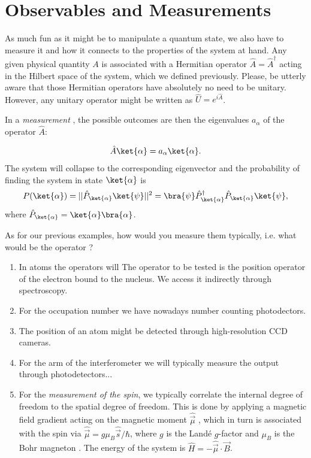 \section{Observables and Measurements}
As much fun as it might be to manipulate a quantum state, we also have to measure it and how it connects to the properties of the system at hand. Any given physical quantity $A$ is associated with a Hermitian operator $\hat{A} = \hat{A}^\dag$ acting in the Hilbert space of the system, which we defined previously. Please, be utterly aware that those Hermitian operators have absolutely no need to be unitary. However, any unitary operator might be written as $\hat{U}= e^{i\hat{A}}$.

In a \emph{measurement} , the possible outcomes are then the eigenvalues $a_\alpha$  of the operator $\hat{A}$:

\begin{align}
	\hat{A}\ket{\alpha}=a_{\alpha}\ket{\alpha}.
\end{align}
The system will collapse to the corresponding eigenvector and the probability of finding the system in state $\ket{\alpha}$ is
\begin{align}
	P(\ket{\alpha})=||\hat{P}_{\ket{\alpha}} \ket{\psi}||^2 = \bra{\psi} \hat{P}^{\dag}_{\ket{\alpha}} \hat{P}_{\ket{\alpha}} \ket{\psi},
\end{align}
where $\hat{P}_{\ket{\alpha}}= \ket{\alpha} \bra{\alpha}$.

As for our previous examples, how would you measure them typically, i.e. what would be the operator ?
\begin{enumerate}
\item In atoms the operators will The operator to be tested is the position operator of the electron bound to the nucleus. We access it indirectly through spectroscopy.
\item For the occupation number we have nowadays number counting photodectors.
\item The position of an atom might be detected through high-resolution CCD cameras.
\item For the arm of the interferometer we will typically measure the output through photodetectors...
\item For the \textit{measurement of the spin}, we typically correlate the internal degree of freedom to the spatial degree of freedom. This is done by applying a magnetic field gradient acting on the magnetic moment $\hat{\vec{\mu}}$ , which in turn is associated with the spin via $\hat{\vec{\mu}} = g \mu_B \hat{\vec{s}}/\hbar$, where $g$ is the Landé $g$-factor  and $\mu_B$ is the Bohr magneton . The energy of the system is $\hat{H} = -\hat{\vec{\mu}} \cdot \vec{B}$.
\end{enumerate}